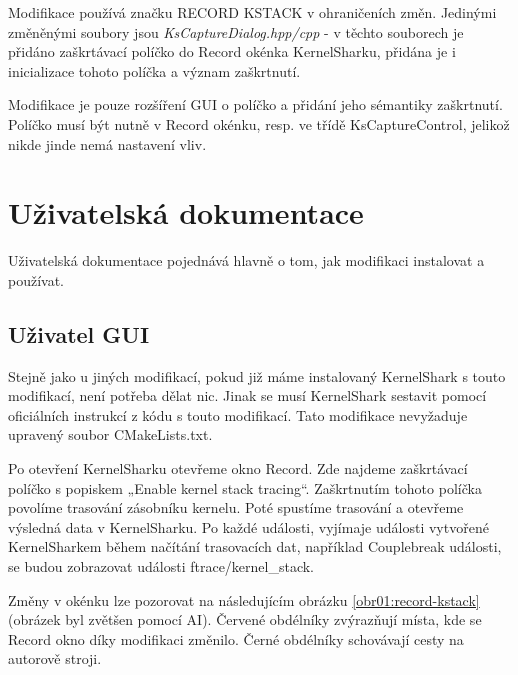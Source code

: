 Modifikace používá značku RECORD KSTACK v ohraničeních změn. Jedinými změněnými soubory jsou \emph{KsCaptureDialog.hpp/cpp} - v těchto souborech je přidáno zaškrtávací políčko do Record okénka KernelSharku, přidána je i inicializace tohoto políčka a význam zaškrtnutí.

Modifikace je pouze rozšíření GUI o políčko a přidání jeho sémantiky zaškrtnutí. Políčko musí být nutně v Record okénku, resp. ve třídě KsCaptureControl, jelikož nikde jinde nemá nastavení vliv.

\section{Uživatelská dokumentace}
Uživatelská dokumentace pojednává hlavně o tom, jak modifikaci instalovat a používat.

\subsection{Uživatel GUI}

Stejně jako u jiných modifikací, pokud již máme instalovaný KernelShark s touto modifikací, není potřeba dělat nic. Jinak se musí KernelShark sestavit pomocí oficiálních instrukcí z kódu s touto modifikací. Tato modifikace nevyžaduje upravený soubor CMakeLists.txt.

Po otevření KernelSharku otevřeme okno Record. Zde najdeme zaškrtávací políčko s popiskem „Enable kernel stack tracing“.
Zaškrtnutím tohoto políčka povolíme trasování zásobníku kernelu. Poté spustíme trasování a otevřeme výsledná data v KernelSharku. Po každé události, vyjímaje události vytvořené KernelSharkem během načítání trasovacích dat, například Couplebreak události, se budou zobrazovat události ftrace/kernel\_stack.

Změny v okénku lze pozorovat na následujícím obrázku \ref{obr01:record-kstack} (obrázek byl zvětšen pomocí AI). Červené obdélníky zvýrazňují místa, kde se Record okno díky modifikaci změnilo. Černé obdélníky schovávají cesty na autorově stroji.

